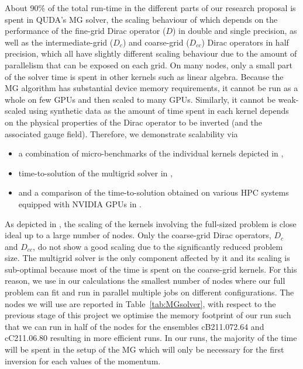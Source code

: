 About 90\% of the total run-time in the different parts of our research proposal is spent in QUDA's MG solver, the scaling behaviour of which depends on the performance of the fine-grid Dirac operator ($D$) in double and single precision, as well as the intermediate-grid ($D_c$) and coarse-grid ($D_{cc}$) Dirac operators in half precision, which all have slightly different scaling behaviour due to the amount of parallelism that can be exposed on each grid.
On many nodes, only a small part of the solver time is spent in other kernels such as linear algebra.
Because the MG algorithm has substantial device memory requirements, it cannot be run as a whole on few GPUs and then scaled to many GPUs.
Similarly, it cannot be weak-scaled using synthetic data as the amount of time spent in each kernel depends on the physical properties of the Dirac operator to be inverted (and the associated gauge field).
Therefore, we demonstrate scalability via
\begin{itemize}
	\item  a combination of micro-benchmarks of the individual kernels depicted in ,
	\item time-to-solution of the multigrid solver in ,
	\item and a comparison of the time-to-solution obtained on various HPC systems equipped with NVIDIA GPUs  in .
\end{itemize}
As depicted in , the scaling of the kernels involving the full-sized problem is close ideal up to a large number of nodes.
Only the coarse-grid Dirac operators, $D_c$ and $D_{cc}$, do not show a good scaling due to the significantly reduced problem size.
The multigrid solver is the only component affected by it and its scaling is sub-optimal because most of the time is spent on the coarse-grid kernels. For this reason, we use in our calculations the smallest number of nodes where our full problem can fit and run in parallel multiple jobs on different configurations.
The nodes we will use are reported in Table~\ref{tab:MGsolver}, with respect to the
previous stage of this project we optimise the memory footprint
of our run such that we can run in half of the nodes for the ensembles cB211.072.64
and cC211.06.80 resulting in more efficient runs.
In our runs, the majority of the time will be spent in the setup of the MG
which will only be necessary for the first inversion for each values of the momentum.

